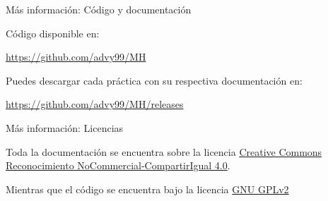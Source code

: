 \documentclass{beamer}
\begin{document}
\begin{frame}{Más información: Código y documentación}

	Código disponible en: 
	
	\begin{center}
		\url{https://github.com/advy99/MH}	
	\end{center}
	
	Puedes descargar cada práctica con su respectiva documentación en:
	
	\begin{center}
		\url{https://github.com/advy99/MH/releases}	
	\end{center}

	
\end{frame}	  
  
\begin{frame}{Más información: Licencias}
  
	Toda la documentación se encuentra sobre la licencia
 	\href{https://creativecommons.org/licenses/by-nc-sa/4.0/deed.es}{Creative Commons
	Reconocimiento NoCommercial-CompartirIgual 4.0}.

	\begin{center}\ccbyncsa\end{center}

	\vspace{1cm}

	Mientras que el código se encuentra bajo la licencia \href{https://www.gnu.org/licenses/old-licenses/gpl-2.0.html}{GNU GPLv2}
  
\end{frame}
\end{document}
